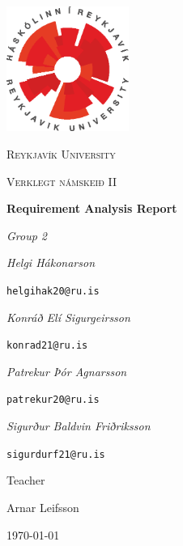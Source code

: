 \documentclass{scrartcl}
\begin{document}
\begin{titlepage}
	\centering
	\includegraphics[width=0.3\textwidth]{ru-logo.eps}\par\vspace{1cm} %
	{\scshape\LARGE Reykjavík University\par} %
	\vspace{1cm}
	{\scshape\Large Verklegt námskeið II\par} %
	\vspace{1.5cm}
	{\huge\bfseries Requirement Analysis Report\par} %
	{\Large\itshape  Group 2 \par}
	\vspace{2cm}
	{\Large\itshape Helgi Hákonarson}\par %
	\texttt{helgihak20@ru.is}\par %
	\vspace{0.5cm}
	{\Large\itshape Konráð Elí Sigurgeirsson}\par %
	\texttt{konrad21@ru.is}\par %
	\vspace{0.5cm}
	{\Large\itshape Patrekur Þór Agnarsson}\par %
	\texttt{patrekur20@ru.is}\par %
	\vspace{0.5cm}
	{\Large\itshape Sigurður Baldvin Friðriksson}\par %
	\texttt{sigurdurf21@ru.is}\par %
	\vfill
	Teacher\par %
	Arnar Leifsson%
	\vfill

	{\large \today\par}
\end{titlepage}
\end{document}
